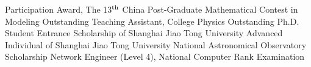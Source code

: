 \documentclass{resume}
\begin{document}
\begin{entries}
    {Participation Award,
      The 13$^{\rm th}$ China Post-Graduate Mathematical Contest in Modeling}
    {Outstanding Teaching Assistant, College Physics}
    {Outstanding Ph.D. Student Entrance Scholarship of Shanghai Jiao Tong University}
    {Advanced Individual of Shanghai Jiao Tong University}
    {National Astronomical Observatory Scholarship}
    {Network Engineer (Level 4), National Computer Rank Examination}
\end{entries}
\end{document}
